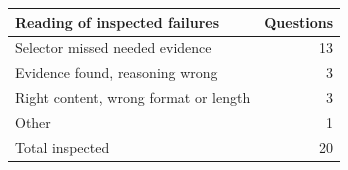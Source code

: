 \begin{tabular}{lr}
\hline
Reading of inspected failures & Questions \\ \hline
Selector missed needed evidence & 13 \\
Evidence found, reasoning wrong & 3 \\
Right content, wrong format or length & 3 \\
Other & 1 \\
Total inspected & 20 \\
\hline
\end{tabular}
